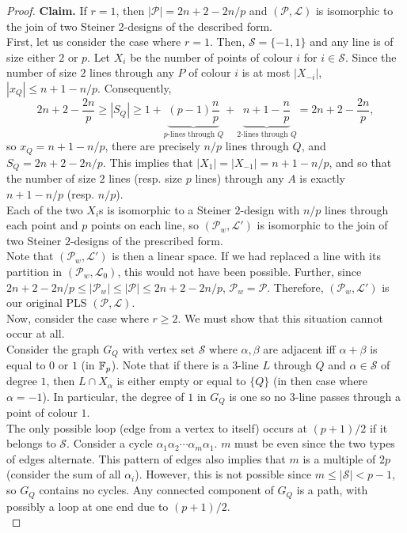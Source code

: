 \begin{proof}
		\textbf{Claim.} If $r = 1$, then $|\mathcal{P}| = 2n+2-2n/p$ and $(\mathcal{P},\mathcal{L})$ is isomorphic to the join of two Steiner 2-designs of the described form.\\
		First, let us consider the case where $r=1$. Then, $\mathcal{S} = \{-1,1\}$ and any line is of size either $2$ or $p$. Let $X_i$ be the number of points of colour $i$ for $i \in \mathcal{S}$. Since the number of size $2$ lines through any $P$ of colour $i$ is at most $|X_{-i}|$, $|x_Q| \le n+1-n/p$. Consequently,
		\[ 2n+2-\frac{2n}{p} \ge |S_Q| \ge 1 + \underbrace{(p-1) \frac{n}{p}}_{\text{$p$-lines through $Q$}} + \underbrace{n+1-\frac{n}{p}}_{\text{$2$-lines through $Q$}} = 2n+2-\frac{2n}{p},  \]
		so $x_Q = n+1-n/p$, there are precisely $n/p$ lines through $Q$, and $S_Q = 2n+2-2n/p$. This implies that $|X_1| = |X_{-1}| = n+1-n/p$, and so that the number of size $2$ lines (resp. size $p$ lines) through any $A$ is exactly $n+1-n/p$ (resp. $n/p$).\\
		Each of the two $X_i$s is isomorphic to a Steiner $2$-design with $n/p$ lines through each point and $p$ points on each line, so $(\mathcal{P}_w,\mathcal{L}')$ is isomorphic to the join of two Steiner $2$-designs of the prescribed form.\\
		Note that $(\mathcal{P}_w,\mathcal{L}')$ is then a linear space. If we had replaced a line with its partition in $(\mathcal{P}_w,\mathcal{L}_0)$, this would not have been possible. %
		Further, since $2n+2-2n/p \le |\mathcal{P}_w| \le |\mathcal{P}| \le 2n+2-2n/p$, $\mathcal{P}_w = \mathcal{P}$. Therefore, $(\mathcal{P}_w,\mathcal{L}')$ is our original PLS $(\mathcal{P},\mathcal{L})$. \qedwhite\\

		Now, consider the case where $r\ge2$. We must show that this situation cannot occur at all.\\ 
		Consider the graph $G_Q$ with vertex set $\mathcal{S}$ where $\alpha,\beta$ are adjacent iff $\alpha+\beta$ is equal to $0$ or $1$ (in $\mathbb{F}_p$). Note that if there is a $3$-line $L$ through $Q$ and $\alpha \in \mathcal{S}$ of degree $1$, then $L \cap X_\alpha$ is either empty or equal to $\{Q\}$ (in then case where $\alpha = -1$). In particular, the degree of $1$ in $G_Q$ is one so no $3$-line passes through a point of colour $1$.\\
		The only possible loop (edge from a vertex to itself) occurs at $(p+1)/2$ if it belongs to $\mathcal{S}$. Consider a cycle $\alpha_1\alpha_2\cdots\alpha_m\alpha_1$. $m$ must be even since the two types of edges alternate. This pattern of edges also implies that $m$ is a multiple of $2p$ (consider the sum of all $\alpha_i$). However, this is not possible since $m \le |\mathcal{S}| < p-1$, so $G_Q$ contains no cycles. Any connected component of $G_Q$ is a path, with possibly a loop at one end due to $(p+1)/2$.\\


\end{proof}
